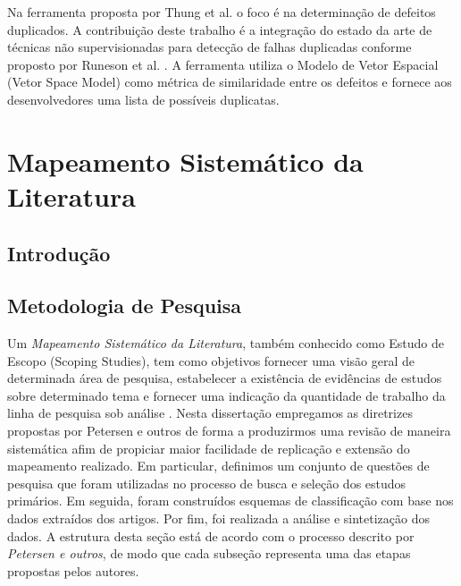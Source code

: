 \documentclass[msc]{ppgccufmg} %
\begin{document}
Na ferramenta proposta por Thung et al. \cite{Thung:2014:DIT:2642937.2648627} o
foco é na determinação de defeitos duplicados. A contribuição deste trabalho é a
integração do estado da arte de técnicas não supervisionadas para detecção de
falhas duplicadas conforme proposto por Runeson et al. \cite{Runeson:2007:DDD:1248820.1248882}. A ferramenta utiliza o Modelo de Vetor Espacial (Vetor Space Model) como métrica de similaridade entre os defeitos e fornece aos desenvolvedores uma lista de possíveis duplicatas.

\chapter{Mapeamento Sistemático da Literatura}
\label{ch:mapeamento-sistematico}

\section{Introdução}
\label{sec:map-intro}

\section{Metodologia de Pesquisa}
\label{sec:map-metodologia}

Um \textit{Mapeamento Sistemático da Literatura}, também conhecido como Estudo de Escopo (Scoping Studies), tem como objetivos fornecer uma visão geral de determinada área de pesquisa, estabelecer a existência de evidências de estudos sobre determinado tema e fornecer uma indicação da quantidade de trabalho da linha de pesquisa sob análise \cite{keele2007guidelines,wohlin2012experimentation}. Nesta dissertação empregamos as diretrizes propostas por Petersen e outros \cite{Petersen2008} de forma a produzirmos uma revisão de maneira sistemática afim de propiciar maior facilidade de replicação e extensão do mapeamento realizado. Em particular, definimos um conjunto de questões de pesquisa que foram utilizadas no processo de busca e seleção dos estudos primários. Em seguida, foram construídos esquemas de classificação com base nos dados extraídos  dos artigos. Por fim, foi realizada a análise e sintetização dos dados. A estrutura desta seção está de acordo com o processo descrito por \textit{Petersen e outros}, de modo que cada subseção representa uma das etapas propostas pelos autores.
\end{document}
